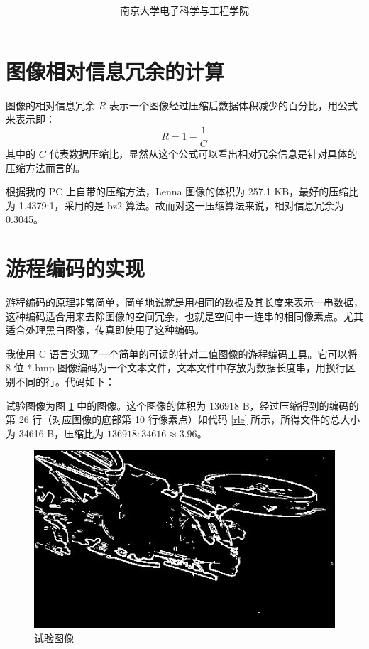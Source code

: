 \documentclass[a4paper,10pt]{article}
\theoremstyle{definition}
\theoremstyle{plain}
\begin{document}
\title{\Title \titlename\\  \vicetitle}
\author{ 南京大学电子科学与工程学院\\   \myauthor} 
\maketitle

\section{图像相对信息冗余的计算}
图像的相对信息冗余 $R$ 表示一个图像经过压缩后数据体积减少的百分比，用公式来表示即：
\begin{equation*}
R=1-\frac{1}{C}
\end{equation*}
其中的 $C$ 代表数据压缩比，显然从这个公式可以看出相对冗余信息是针对具体的压缩方法而言的。

根据我的 PC 上自带的压缩方法，Lenna 图像的体积为 257.1 KB，最好的压缩比为 1.4379:1，采用的是 bz2 算法。故而对这一压缩算法来说，相对信息冗余为 0.3045。
\section{游程编码的实现}
游程编码的原理非常简单，简单地说就是用相同的数据及其长度来表示一串数据，这种编码适合用来去除图像的空间冗余，也就是空间中一连串的相同像素点。尤其适合处理黑白图像，传真即使用了这种编码。

我使用 C 语言实现了一个简单的可读的针对二值图像的游程编码工具。它可以将 8 位 *.bmp 图像编码为一个文本文件，文本文件中存放为数据长度串，用换行区别不同的行。代码如下：


试验图像为图 \ref{exp} 中的图像。这个图像的体积为 136918 B，经过压缩得到的编码的第 26 行（对应图像的底部第 10 行像素点）如代码 \ref{rle} 所示，所得文件的总大小为 34616 B，压缩比为 $136918:34616\approx3.96$。

\begin{figure}[htbp]
\centering
\includegraphics[scale=.8]{f2.jpg}
\caption{试验图像\label{exp}}
\end{figure}
\end{document}
